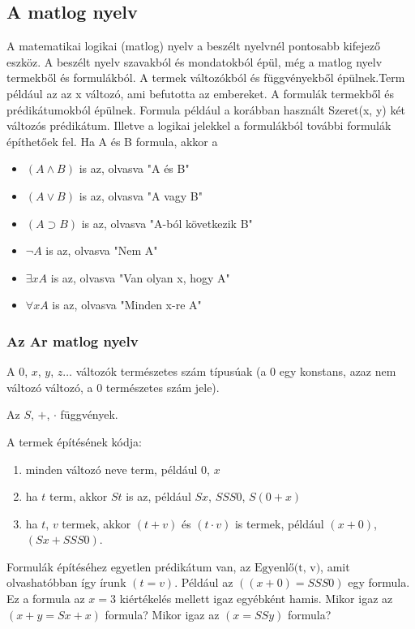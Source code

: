 \documentclass{article}
\begin{document}
\subsection{A matlog nyelv}

A matematikai logikai (matlog) nyelv a beszélt nyelvnél pontosabb kifejező eszköz. A beszélt nyelv szavakból és mondatokból épül, még a matlog nyelv termekből és formulákból. A termek változókból és függvényekből épülnek.Term például az az x változó, ami befutotta az embereket. A formulák termekből és prédikátumokból épülnek. Formula például a korábban használt Szeret(x, y) két változós prédikátum. Illetve a logikai jelekkel a formulákból további formulák építhetőek fel. Ha A és B formula, akkor a
\begin{itemize}
\item
$(A \wedge B)$ is az,  olvasva "A és B"
\item
$(A \vee B)$ is az,  olvasva "A vagy B"
\item
$(A \supset B)$ is az,  olvasva "A-ból következik B"
\item
$\neg A$ is az, olvasva "Nem A"
\item
$\exists x A$ is az,  olvasva "Van olyan x, hogy A"
\item
$ \forall x A$ is az, olvasva "Minden x-re A"
 \end{itemize}

\subsubsection{Az Ar matlog nyelv}

A $0$, $x$, $y$, $z \dots$ változók természetes szám típusúak (a 0 egy konstans, azaz nem változó változó, a 0 természetes szám jele).

Az $S$, $+$, $\cdot$ függvények. 

A termek építésének kódja:
\begin{enumerate}
\item
minden változó neve term, például $0$, $x$
\item
ha $t$ term, akkor $St$ is az, például $Sx$, $SSS0$, $S(0+x)$
\item
ha $t$, $v$ termek, akkor $(t+v)$ és $(t \cdot v)$ is termek, például $(x+0)$, $(Sx+SSS0)$.
 \end{enumerate}

Formulák építéséhez egyetlen prédikátum van, az $\text{Egyenlő(t, v)}$, amit olvashatóbban így írunk $(t=v)$.
Például az $((x+0) = SSS0)$ egy formula. Ez a formula az $x=3$ kiértékelés mellett igaz egyébként hamis.
Mikor igaz az $(x+y = Sx+x)$ formula? Mikor igaz az $(x = SSy)$ formula?
\end{document}
